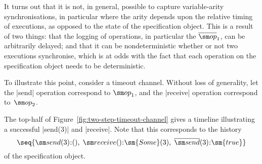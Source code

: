 It turns out that it is not, in general, possible to capture variable-arity
synchronisations, in particular where the arity depends upon the relative
timing of executions, as opposed to the state of the specification object.
This is a result of two things: that the logging of operations, in particular
the $\overline{\op}_1$, can be arbitrarily delayed; and that it can be
nondeterministic whether or not two executions synchronise, which is at odds
with the fact that each operation on the specification object needs to be
deterministic.

To illustrate this point, consider a timeout channel.  Without loss of
generality, let the |send| operation correspond to $\op_1$, and the
|receive| operation correspond to~$\op_2$.

The top-half of Figure~\ref{fig:two-step-timeout-channel} gives a
timeline illustrating a successful |send(3)| and |receive|.  Note that this
corresponds to the history
\[
\seq{ \send(3)\::(),\; \receive()\::\sm{Some}(3),\; 
  \overline{\send}(3)\::\sm{true} }
\]
of the specification object.


